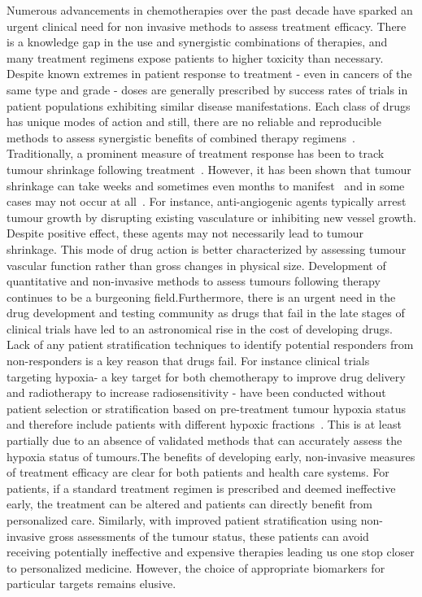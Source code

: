 Numerous advancements in chemotherapies over the past decade have sparked an urgent clinical need for non invasive methods to assess treatment efficacy.
There is a knowledge gap in the use and synergistic combinations of therapies, and many treatment regimens expose patients to higher toxicity than necessary.
Despite known extremes in patient response to treatment - even in cancers of the same type and grade - doses are generally prescribed by success rates of trials in patient populations exhibiting similar disease manifestations.
Each class of drugs has unique modes of action and still, there are no reliable and reproducible methods to assess synergistic benefits of combined therapy regimens~\cite{Zhang:2008ie}.
Traditionally, a prominent measure of treatment response has been to track tumour shrinkage following treatment~\cite{Tuma:2006hx}.
However, it has been shown that tumour shrinkage can take weeks and sometimes even months to manifest~\cite{Brindle:2008jt} and in some cases may not occur at all~\cite{Kitzen:2008un}.
For instance, anti-angiogenic agents typically arrest tumour growth by disrupting existing vasculature or inhibiting new vessel growth.
Despite positive effect, these agents may not necessarily lead to tumour shrinkage.
This mode of drug action is better characterized by assessing tumour vascular function rather than gross changes in physical size.
Development of quantitative and non-invasive methods to assess tumours following therapy continues to be a burgeoning field.Furthermore, there is an urgent need in the drug development and testing community as drugs that fail in the late stages of clinical trials have led to an astronomical rise in the cost of developing drugs.
Lack of any patient stratification techniques to identify potential responders from non-responders is a key reason that drugs fail.
For instance clinical trials targeting hypoxia- a key target for both chemotherapy to improve drug delivery and radiotherapy to increase radiosensitivity - have been conducted without patient selection or stratification based on pre-treatment tumour hypoxia status and therefore include patients with different hypoxic fractions~\cite{Overgaard:2011ji}.
This is at least partially due to an absence of validated methods that can accurately assess the hypoxia status of tumours.The benefits of developing early, non-invasive measures of treatment efficacy are clear for both patients and health care systems.
For patients, if a standard treatment regimen is prescribed and deemed ineffective early, the treatment can be altered and patients can directly benefit from personalized care.
Similarly, with improved patient stratification using non-invasive gross assessments of the tumour status, these patients can avoid receiving potentially ineffective and expensive therapies leading us one stop closer to personalized medicine.
However, the choice of appropriate biomarkers for particular targets remains elusive. 

